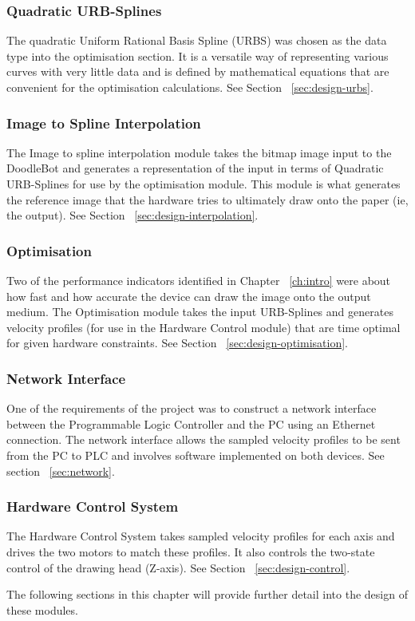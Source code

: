 	\subsubsection*{Quadratic URB-Splines}
		The quadratic Uniform Rational Basis Spline (URBS) was chosen as the data type into the optimisation section. It is a versatile way of representing various curves with very little data and is defined by mathematical equations that are convenient for the optimisation calculations. See Section ~\ref{sec:design-urbs}.
		
	\subsubsection*{Image to Spline Interpolation}
		The Image to spline interpolation module takes the bitmap image input to the DoodleBot and generates a representation of the input in terms of Quadratic URB-Splines for use by the optimisation module. This module is what generates the reference image that the hardware tries to ultimately draw onto the paper (ie, the output). See Section ~\ref{sec:design-interpolation}.
		
	\subsubsection*{Optimisation}
		Two of the performance indicators identified in Chapter ~\ref{ch:intro} were about how fast and how accurate the device can draw the image onto the output medium. The Optimisation module takes the input URB-Splines and generates velocity profiles (for use in the Hardware Control module) that are time optimal for given hardware constraints. See Section ~\ref{sec:design-optimisation}.

	\subsubsection*{Network Interface}
		One of the requirements of the project was to construct a network interface between the Programmable Logic Controller and the PC using an Ethernet connection. The network interface allows the sampled velocity profiles to be sent from the PC to PLC and involves software implemented on both devices. See section ~\ref{sec:network}.

	\subsubsection*{Hardware Control System}
		The Hardware Control System takes sampled velocity profiles for each axis and drives the two motors to match these profiles. It also controls the two-state control of the drawing head (Z-axis). See Section ~\ref{sec:design-control}.
		
The following sections in this chapter will provide further detail into the design of these modules.